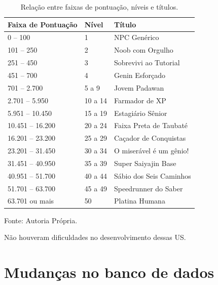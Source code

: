 \begin{table}
    \centering
    \caption{Relação entre faixas de pontuação, níveis e títulos.}
    \label{tab:niveis-titulos}
    \begin{tabular}{|l|l|l|}
        \hline
        \textbf{Faixa de Pontuação} & \textbf{Nível} & \textbf{Título} \\
        \hline
        0 -- 100 & 1 & NPC Genérico 
        \\
        \hline
        101 -- 250 & 2 & Noob com Orgulho
        \\
        \hline
        251 -- 450 & 3 & Sobrevivi ao Tutorial
        \\
        \hline
        451 -- 700 & 4 & Genin Esforçado
        \\
        \hline
        701 -- 2.700 & 5 a 9 & Jovem Padawan
        \\
        \hline
        2.701 -- 5.950 & 10 a 14 & Farmador de XP
        \\
        \hline
        5.951 -- 10.450 & 15 a 19 & Estagiário Sênior
        \\
        \hline
        10.451 -- 16.200 & 20 a 24 & Faixa Preta de Taubaté 
        \\
        \hline
        16.201 -- 23.200 & 25 a 29 & Caçador de Conquistas 
        \\
        \hline
        23.201 -- 31.450 & 30 a 34 & O miserável é um gênio!
        \\
        \hline
        31.451 -- 40.950 & 35 a 39 & Super Saiyajin Base
        \\
        \hline
        40.951 -- 51.700 & 40 a 44 & Sábio dos Seis Caminhos
        \\
        \hline
        51.701 -- 63.700 & 45 a 49 & Speedrunner do Saber 
        \\
        \hline
        63.701 ou mais & 50 & Platina Humana  
        \\
        \hline
    \end{tabular}
    \vspace{0.2cm} %
    
    Fonte: Autoria Própria.
\end{table}

Não houveram dificuldades no desenvolvimento dessas US.

\section[Mudanças no banco de dados]{Mudanças no banco de dados}

